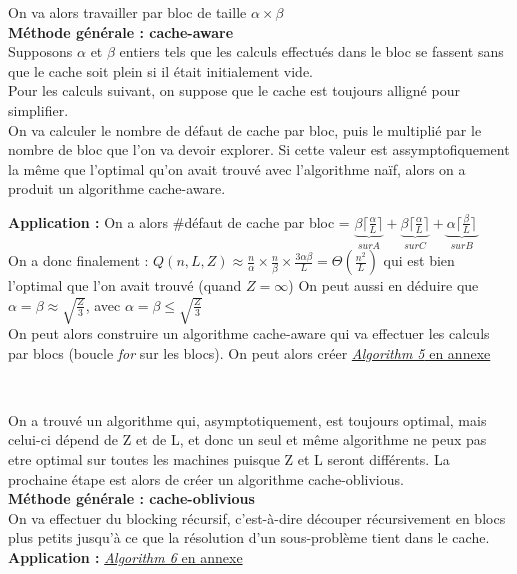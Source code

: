 \documentclass[
  paper=a4,
  ,captions=tableheading
]{scrartcl}
\begin{document}
On va alors travailler par bloc de taille \(\alpha \times \beta\)\\
\textbf{Méthode générale : cache-aware}\\
Supposons \(\alpha\) et \(\beta\) entiers tels que les calculs effectués
dans le bloc se fassent sans que le cache soit plein si il était
initialement vide.\\
Pour les calculs suivant, on suppose que le cache est toujours alligné
pour simplifier.\\
On va calculer le nombre de défaut de cache par bloc, puis le multiplié
par le nombre de bloc que l'on va devoir explorer. Si cette valeur est
assymptofiquement la même que l'optimal qu'on avait trouvé avec
l'algorithme naïf, alors on a produit un algorithme cache-aware.

\textbf{Application :} On a alors \#défaut de cache par bloc =
\(\underbrace{ \beta\lceil \frac{\alpha}{L}\rceil}_{sur A}+ \underbrace{\beta\lceil \frac{\alpha}{L}\rceil}_{sur C} + \underbrace{ \alpha\lceil \frac{\beta}{L}\rceil}_{sur B}\)\\
On a donc finalement :
\(Q(n,L,Z) \approx \frac{n}{\alpha} \times \frac{n}{\beta} \times \frac{3 \alpha\beta}{L} = \Theta(\frac{n^2}{L})\)
qui est bien l'optimal que l'on avait trouvé (quand \(Z = \infty\)) On
peut aussi en déduire que \(\alpha = \beta \approx \sqrt{\frac{Z}{3}}\),
avec \(\alpha = \beta \leq \sqrt{\frac{Z}{3}}\)\\
On peut alors construire un algorithme cache-aware qui va effectuer les
calculs par blocs (boucle \emph{for} sur les blocs). On peut alors créer
\protect\hyperlink{algorithm5}{\emph{Algorithm 5} en annexe}

~

On a trouvé un algorithme qui, asymptotiquement, est toujours optimal,
mais celui-ci dépend de Z et de L, et donc un seul et même algorithme ne
peux pas etre optimal sur toutes les machines puisque Z et L seront
différents. La prochaine étape est alors de créer un algorithme
cache-oblivious.\\
\textbf{Méthode générale : cache-oblivious}\\
On va effectuer du blocking récursif, c'est-à-dire découper
récursivement en blocs plus petits jusqu'à ce que la résolution d'un
sous-problème tient dans le cache.\\
\textbf{Application :} \protect\hyperlink{algorithm6}{\emph{Algorithm 6}
en annexe}

~\\
\hspace*{0.333em}
\end{document}
